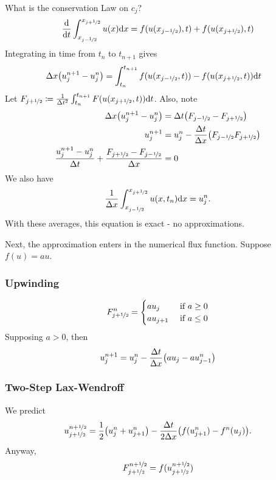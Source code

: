 \documentclass{article}
\newcommand{\half}{\nicefrac{1}{2}}
\newcommand{\Dx}{\Delta x}
\newcommand{\Dt}{\Delta t}
\begin{document}
            What is the conservation Law on $c_j$?
            \begin{align*}
                \frac{\dd}{\dd t}\int_{x_{j-\half}}^{x_{j+\half}}u(x)\dd x = f(u({x_{j-\half}}),t) + f(u({x_{j+\half}}),t)
            \end{align*}
            Integrating in time from $t_n$ to $t_{n+1}$ gives
            \begin{align*}
                \Dx\qty(u_j^{n+1} - u_j^n) &= \int_{t_n}^{t_{n+1}} f(u(x_{j-\half},t)) - f(u(x_{j+\half},t)) \dd t
            \end{align*}
            Let $F_{j+\half} \coloneqq \frac{1}{\Dt^2}\int_{t_n}^{t_{n+1}}F(u(x_{j+\half},t))\dd t$.  Also, note
            \begin{align*}
                \Dx\qty(u_j^{n+1} - u_j^n) &= \Dt\qty(F_{j-\half} - F_{j+\half}) \\
                u_j^{n+1} &= u_j^n - \frac{\Dt}{\Dx}\qty(F_{j-\half}{F_{j+\half}}) \\
                \frac{u_j^{n+1} - u_j^n}{\Dt} + \frac{F_{j+\half} - F_{j-\half}}{\Dx} &= 0
            \end{align*}
            We also have
            \begin{align*}
                \frac{1}{\Dx}\int_{x_{j-\half}}^{x_{j+\half}}u(x,t_n)\dd x = u_j^n.
            \end{align*}
            With these averages, this equation is exact - no approximations.

            Next, the approximation enters in the numerical flux function.  Suppose $f(u) = au$.

            \subsubsection{Upwinding}

                \begin{align*}
                    F_{j+\half}^n = \begin{cases}
                        au_j & \text{ if } a \geq 0\\
                        au_{j+1} & \text{ if } a \leq 0
                    \end{cases}
                \end{align*}
                Supposing $a > 0$, then
                \begin{align*}
                    u_j^{n+1} = u_j^n - \frac{\Dt}{\Dx}\qty(a u_j- au_{j-1}^n)
                \end{align*}

            \subsubsection{Two-Step Lax-Wendroff}

                We predict $$u_{j+\half}^{n+\half} = \frac{1}{2}\qty(u_j^n + u_{j+1}^n) - \frac{\Dt}{2\Dx}\qty(f({u_{j+1}^n}) - f^n(u_j)).$$  Anyway,
                \begin{align*}
                    F_{j+\half}^{n+\half} = f(u_{j+\half}^{n+\half})
                \end{align*}
\end{document}
